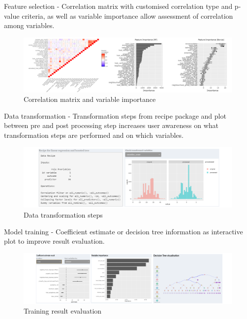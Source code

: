 \documentclass{acm_proc_article-sp}
\begin{document}
Feature selection - Correlation matrix with customised correlation type
and p-value criteria, as well as variable importance allow assessment of
correlation among variables.

\begin{figure}[H]

{\centering \includegraphics[width=1\linewidth]{images/featselect} 

}

\caption{Correlation matrix and variable importance}\label{fig:unnamed-chunk-6}
\end{figure}

Data transformation - Transformation steps from recipe package and plot
between pre and post processing step increases user awareness on what
transformation steps are performed and on which variables.

\begin{figure}[H]

{\centering \includegraphics[width=1\linewidth]{images/recipetrf} 

}

\caption{Data transformation steps}\label{fig:unnamed-chunk-7}
\end{figure}

Model training - Coefficient estimate or decision tree information as
interactive plot to improve result evaluation.

\begin{figure}[H]

{\centering \includegraphics[width=1\linewidth]{images/mdltrn} 

}

\caption{Training result evaluation}\label{fig:unnamed-chunk-8}
\end{figure}
\end{document}
